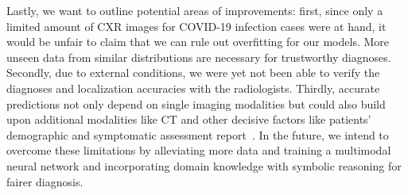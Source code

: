 \documentclass[conference]{IEEEtran}
\begin{document}
Lastly, we want to outline potential areas of improvements: 
first, since only a limited amount of CXR images for COVID-19 infection cases were at hand, it would be unfair to claim that we can rule out overfitting for our models. More unseen data from similar distributions are necessary for trustworthy diagnoses. 
Secondly, due to external conditions, we were yet not been able to verify the diagnoses and localization accuracies with the radiologists. 
Thirdly, accurate predictions not only depend on single imaging modalities but could also build upon additional modalities like CT and other decisive factors like patients' demographic and symptomatic assessment report~\cite{7}. 
In the future, we intend to overcome these limitations by alleviating more data and training a multimodal neural network and incorporating domain knowledge with symbolic reasoning for fairer diagnosis.



\end{document}
